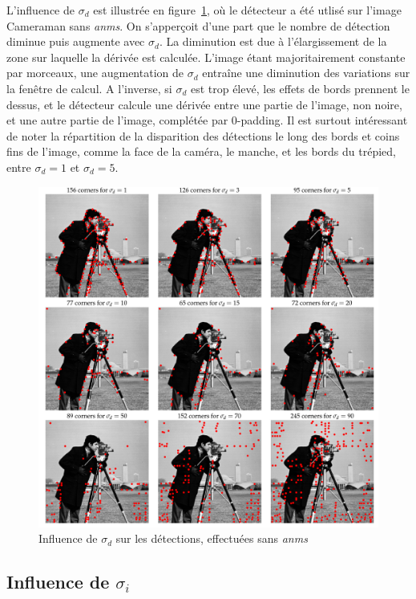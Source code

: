 \documentclass[12pt,a4paper,onecolumn]{article}
\begin{document}
L'influence de \(\sigma_d\) est illustrée en figure~\ref{fig_2_sigma_d}, où le détecteur a été utlisé sur l'image Cameraman sans \textit{anms}. On s'apperçoit d'une part que le nombre de détection diminue puis augmente avec \(\sigma_d\). La diminution est due à l'élargissement de la zone sur laquelle la dérivée est calculée. L'image étant majoritairement constante par morceaux, une augmentation de \(\sigma_d\) entraîne une diminution des variations sur la fenêtre de calcul. A l'inverse, si \(\sigma_d\) est trop élevé, les effets de bords prennent le dessus, et le détecteur calcule une dérivée entre une partie de l'image, non noire, et une autre partie de l'image, complétée par 0-padding.
Il est surtout intéressant de noter la répartition de la disparition des détections le long des bords et coins fins de l'image, comme la face de la caméra, le manche, et les bords du trépied, entre \(\sigma_d = 1\) et \(\sigma_d = 5\).

\begin{figure}[H]
	\centering
	\includegraphics[width = 1.0\textwidth]{2_cameraman_sd}
	\caption{Influence de \(\sigma_d\) sur les détections, effectuées sans \textit{anms}}
	\label{fig_2_sigma_d}
\end{figure}

\subsection{Influence de \(\sigma_i\)}
\end{document}
